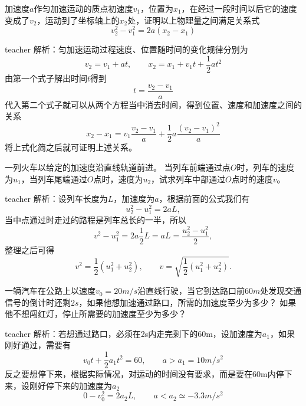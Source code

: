 \begin{example}
加速度$a$作匀加速运动的质点初速度$v_1$，位置为$x_1$，在经过一段时间以后它的速度变成了$v_2$，运动到了坐标轴上的$x_2$处，证明以上物理量之间满足关系式
\[
v_2^2-v_1^2=2a(x_2-x_1)
\]
\begin{taggedblock}{teacher}
\noindent
解析：匀加速运动过程速度、位置随时间的变化规律分别为
\[v_2=v_1+at,\qquad x_2=x_1+v_1 t+\frac{1}{2}at^2\]
由第一个式子解出时间$t$得到
\[
t = \frac{v_2-v_1}{a}
\]
代入第二个式子就可以从两个方程当中消去时间，得到位置、速度和加速度之间的关系
\[
x_2-x_1 = v_1\frac{v_2-v_1}{a}+\frac{1}{2}a\frac{(v_2-v_1)^2}{a}
\]
将上式化简之后就可证明上述关系。
\end{taggedblock}
\end{example}

\begin{example}
一列火车以给定的加速度沿直线轨道前进。
当列车前端通过点$O$时，列车的速度为$u_1$，当列车尾端通过$O$点时，速度为$u_2$，试求列车中部通过$O$点时的速度$v$。
\begin{taggedblock}{teacher}
\newline
解析：设列车长度为$L$，加速度为$a$，根据前面的公式我们有
\[
u_2^2-u_1^2 = 2aL,
\]
当中点通过时走过的路程是列车总长的一半，所以
\[
v^2-u_1^2 = 2a\frac{1}{2}L = aL = \frac{u_2^2-u_1^2}{2},
\]
整理之后可得
\[
v^2 = \frac{1}{2}(u_1^2+u_2^2),\qquad v = \sqrt{\frac{1}{2}(u_1^2+u_2^2)}.
\]
\end{taggedblock}
\end{example}


\begin{example}
一辆汽车在公路上以速度$v_0 = 20\unit{m/s}$沿直线行驶，当它到达路口前$60\unit{m}$处发现交通信号的倒计时还剩$2\unit{s}$，如果他想加速通过路口，所需的加速度至少为多少？
如果他不想闯红灯，停止所需要的加速度至少为多少？
\begin{taggedblock}{teacher}
\newline
解析：若想通过路口，必须在2s内走完剩下的60m，设加速度为$a_1$，如果刚好通过，需要有
\[
v_0 t +\frac{1}{2}a_1t^2 = 60,\qquad a>a_1 = 10\unit{m/s^2}
\]
反之要想停下来，根据实际情况，对运动的时间没有要求，而是要在60m内停下来，设刚好停下来的加速度为$a_2$
\[
0-v_0^2 = 2a_2L,\qquad a<a_2 \simeq -3.3\unit{m/s^2}
\]
\end{taggedblock}
\end{example}

